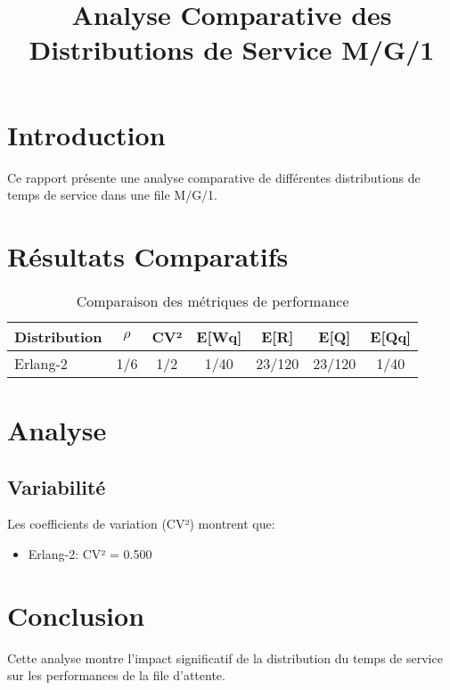 \documentclass{article}
\title{Analyse Comparative des Distributions de Service M/G/1}
\begin{document}
\maketitle
\section{Introduction}
Ce rapport présente une analyse comparative de différentes distributions de temps de service dans une file M/G/1.
\section{Résultats Comparatifs}
\begin{table}[H]
\centering
\begin{tabular}{lcccccc}
\toprule
Distribution & $\rho$ & CV² & E[Wq] & E[R] & E[Q] & E[Qq] \\
\midrule
Erlang-2 & 1/6 & 1/2 & 1/40 & 23/120 & 23/120 & 1/40 \\
\bottomrule
\end{tabular}
\caption{Comparaison des métriques de performance}
\end{table}
\section{Analyse}
\subsection{Variabilité}
Les coefficients de variation (CV²) montrent que:
\begin{itemize}
\item Erlang-2: CV² = 0.500
\end{itemize}
\section{Conclusion}
Cette analyse montre l'impact significatif de la distribution du temps de service sur les performances de la file d'attente.
\end{document}
